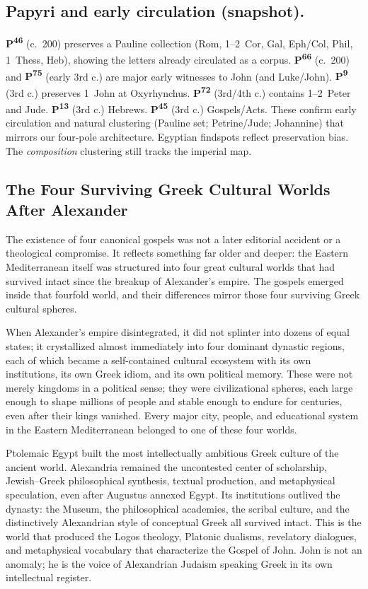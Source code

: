 \subsection{Papyri and early circulation (snapshot).}\label{subsec:papyri-and-early-circulation}
\textbf{P\textsuperscript{46}} (c.~200) preserves a Pauline collection (Rom, 1--2~Cor, Gal, Eph/Col, Phil, 1~Thess, Heb), showing the letters already circulated as a corpus.
\textbf{P\textsuperscript{66}} (c.~200) and \textbf{P\textsuperscript{75}} (early 3rd c.) are major early witnesses to John (and Luke/John).
\textbf{P\textsuperscript{9}} (3rd c.) preserves 1~John at Oxyrhynchus.
\textbf{P\textsuperscript{72}} (3rd/4th c.) contains 1--2~Peter and Jude.
\textbf{P\textsuperscript{13}} (3rd c.) Hebrews.
\textbf{P\textsuperscript{45}} (3rd c.) Gospels/Acts.
These confirm early circulation and natural clustering (Pauline set; Petrine/Jude; Johannine) that mirrors our four-pole architecture.
Egyptian findspots reflect preservation bias.
The \emph{composition} clustering still tracks the imperial map.

\subsection{The Four Surviving Greek Cultural Worlds After Alexander}

The existence of four canonical gospels was not a later editorial accident or a theological compromise.
It reflects something far older and deeper: the Eastern Mediterranean itself was structured into four great cultural worlds that had survived intact since the breakup of Alexander's empire.
The gospels emerged inside that fourfold world, and their differences mirror those four surviving Greek cultural spheres.

When Alexander's empire disintegrated, it did not splinter into dozens of equal states; it crystallized almost immediately into four dominant dynastic regions, each of which became a self-contained cultural ecosystem with its own institutions, its own Greek idiom, and its own political memory.
These were not merely kingdoms in a political sense; they were civilizational spheres, each large enough to shape millions of people and stable enough to endure for centuries, even after their kings vanished.
Every major city, people, and educational system in the Eastern Mediterranean belonged to one of these four worlds.

Ptolemaic Egypt built the most intellectually ambitious Greek culture of the ancient world.
Alexandria remained the uncontested center of scholarship, Jewish--Greek philosophical synthesis, textual production, and metaphysical speculation, even after Augustus annexed Egypt.
Its institutions outlived the dynasty: the Museum, the philosophical academies, the scribal culture, and the distinctively Alexandrian style of conceptual Greek all survived intact.
This is the world that produced the Logos theology, Platonic dualisms, revelatory dialogues, and metaphysical vocabulary that characterize the Gospel of John.
John is not an anomaly; he is the voice of Alexandrian Judaism speaking Greek in its own intellectual register.

